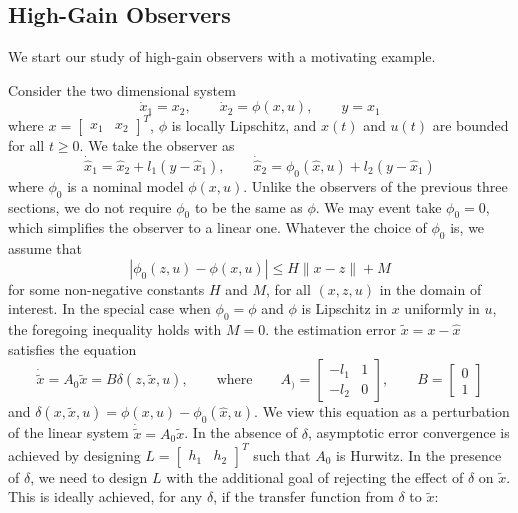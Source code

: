 \documentclass[12pt,a4paper,oneside]{book}
\begin{document}
\begin{onehalfspace}
\section{High-Gain Observers}
We start our study of high-gain observers with a motivating example.
\begin{example}
	Consider the two dimensional system
	\begin{equation*}
		\dot{x}_1=x_2,\qquad\dot{x}_2=\phi(x,u),\qquad y=x_1
	\end{equation*}
	where $x=\begin{bmatrix} x_1&x_2\end{bmatrix}^T$, $\phi$ is locally Lipschitz, and $x(t)$ and $u(t)$ are bounded for all $t\ge0$. We take the observer as
	\begin{equation*}
		\dot{\hat{x}}_1=\hat{x}_2+l_1(y-\hat{x}_1),\qquad\dot{\hat{x}}_2=\phi_0(\hat{x},u)+l_2(y-\hat{x}_1)
	\end{equation*}
	where $\phi_0$ is a nominal model $\phi(x,u)$. Unlike the observers of the previous three sections, we do not require $\phi_0$ to be the same as $\phi$. We may event take $\phi_0=0$, which simplifies the observer to a linear one. Whatever the choice of $\phi_0$ is, we assume that 
	\begin{equation*}
		|\phi_0(z,u)-\phi(x,u)|\le H\|x-z\|+M
	\end{equation*} 
	for some non-negative constants $H$ and $M$, for all $(x,z,u)$ in the domain of interest. In the special case when $\phi_0=\phi$ and $\phi$ is Lipschitz in $x$ uniformly in $u$, the foregoing inequality holds with $M=0$. the estimation error $\tilde{x}=x-\hat{x}$ satisfies the equation
	\begin{equation}
		\dot{\tilde{x}}=A_0\tilde{x}=B\delta(z,\tilde{x},u),\qquad\text{where}\qquad A_)=\begin{bmatrix} -l_1 & 1 \\[6pt] -l_2 & 0 \end{bmatrix},\qquad B=\begin{bmatrix} 0 \\[6pt] 1 \end{bmatrix}
	\end{equation}
	and $\delta(x,\tilde{x},u)=\phi(x,u)-\phi_0(\hat{x},u)$. We view this equation as a perturbation of the linear system $\dot{\tilde{x}}=A_0\tilde{x}$. In the absence of $\delta$, asymptotic error convergence is achieved by designing $L=\begin{bmatrix} h_1&h_2 \end{bmatrix}^T$ such that $A_0$ is Hurwitz. In the presence of $\delta$, we need to design $L$ with the additional goal of rejecting the effect of $\delta$ on $\tilde{x}$. This is ideally achieved, for any $\delta$, if the transfer function from $\delta$ to $\tilde{x}$:

\end{example}
\end{onehalfspace}
\end{document}
